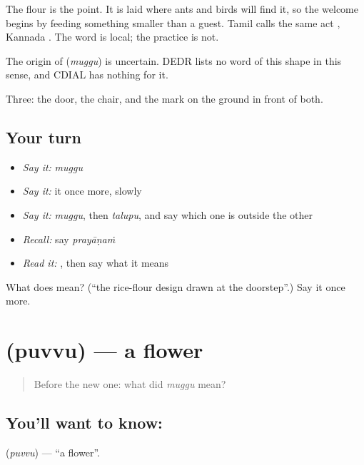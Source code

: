 The flour is the point. It is laid where ants and birds will find it, so the welcome begins by feeding something smaller than a guest. Tamil calls the same act , Kannada . The word is local; the practice is not.

\begin{cousinweb}
The origin of \textbf{} (\emph{muggu}) is uncertain. DEDR lists no word of this shape in this sense, and CDIAL has nothing for it.
\end{cousinweb}

\begin{grammarlens}[title={What you've built}]
Three: the door, the chair, and the mark on the ground in front of both.
\end{grammarlens}

\subsection*{Your turn}
\begin{itemize}
\raggedright
  \item \emph{Say it:} \emph{muggu}
  \item \emph{Say it:} it once more, slowly
  \item \emph{Say it:} \emph{muggu}, then \emph{talupu}, and say which one is outside the other
  \item \emph{Recall:} say \emph{prayāṇaṁ}
  \item \emph{Read it:} \textbf{}, then say what it means
\end{itemize}

\begin{tcolorbox}[breakable,colback=teal!4,colframe=teal!35!black,title={Before you move on}]
What does  mean? (\textquotedblleft{}the rice-flour design drawn at the doorstep\textquotedblright{}.) Say it once more.
\end{tcolorbox}
\section[\texorpdfstring{\te{పువ్వు} (puvvu)}{పువ్వు (puvvu)}]{ (puvvu) — a flower}

\label{lesson:TE-C52-flower}



\begin{quote}
Before the new one: what did \emph{muggu} mean?
\end{quote}

\subsection*{You'll want to know: }
\textbf{} (\emph{puvvu}) — \textquotedblleft{}a flower\textquotedblright{}.

